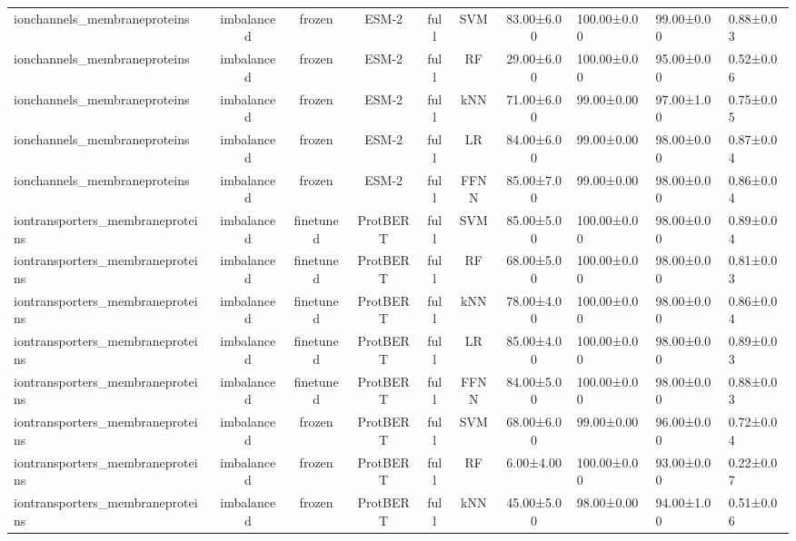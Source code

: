 \begin{tabular}{lcccccc}
    ionchannels\_membraneproteins & imbalanced &         frozen &        ESM-2 &      full &        SVM &  83.00±6.00 & 100.00±0.00 &  99.00±0.00 & 0.88±0.03 \\
    ionchannels\_membraneproteins & imbalanced &         frozen &        ESM-2 &      full &         RF &  29.00±6.00 & 100.00±0.00 &  95.00±0.00 & 0.52±0.06 \\
    ionchannels\_membraneproteins & imbalanced &         frozen &        ESM-2 &      full &        kNN &  71.00±6.00 &  99.00±0.00 &  97.00±1.00 & 0.75±0.05 \\
    ionchannels\_membraneproteins & imbalanced &         frozen &        ESM-2 &      full &         LR &  84.00±6.00 &  99.00±0.00 &  98.00±0.00 & 0.87±0.04 \\
    ionchannels\_membraneproteins & imbalanced &         frozen &        ESM-2 &      full &       FFNN &  85.00±7.00 &  99.00±0.00 &  98.00±0.00 & 0.86±0.04 \\
iontransporters\_membraneproteins & imbalanced &      finetuned &     ProtBERT &      full &        SVM &  85.00±5.00 & 100.00±0.00 &  98.00±0.00 & 0.89±0.04 \\
iontransporters\_membraneproteins & imbalanced &      finetuned &     ProtBERT &      full &         RF &  68.00±5.00 & 100.00±0.00 &  98.00±0.00 & 0.81±0.03 \\
iontransporters\_membraneproteins & imbalanced &      finetuned &     ProtBERT &      full &        kNN &  78.00±4.00 & 100.00±0.00 &  98.00±0.00 & 0.86±0.04 \\
iontransporters\_membraneproteins & imbalanced &      finetuned &     ProtBERT &      full &         LR &  85.00±4.00 & 100.00±0.00 &  98.00±0.00 & 0.89±0.03 \\
iontransporters\_membraneproteins & imbalanced &      finetuned &     ProtBERT &      full &       FFNN &  84.00±5.00 & 100.00±0.00 &  98.00±0.00 & 0.88±0.03 \\
iontransporters\_membraneproteins & imbalanced &         frozen &     ProtBERT &      full &        SVM &  68.00±6.00 &  99.00±0.00 &  96.00±0.00 & 0.72±0.04 \\
iontransporters\_membraneproteins & imbalanced &         frozen &     ProtBERT &      full &         RF &   6.00±4.00 & 100.00±0.00 &  93.00±0.00 & 0.22±0.07 \\
iontransporters\_membraneproteins & imbalanced &         frozen &     ProtBERT &      full &        kNN &  45.00±5.00 &  98.00±0.00 &  94.00±1.00 & 0.51±0.06 \\

\end{tabular}
